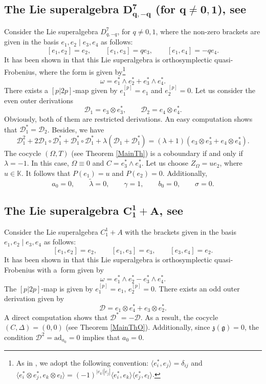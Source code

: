 \documentclass[pdftex]{sigma}
\numberwithin{equation}{section}
\begin{document}
\subsection[The Lie superalgebra D\^{}7\_\{q,-q\} (for q not = 0,1), see cite{Ba}]{The Lie superalgebra $\boldsymbol{D^7_{q,-q}}$ (for $\boldsymbol{q\not = 0,1}$), see \cite{Ba}} Consider the Lie superalgebra $D^7_{q,-q}$, for $q\not = 0,1$, where the non-zero brackets are given in the basis $e_1, e_2\mid e_3, e_4$ as follows:
\[
[e_1, e_2]=e_2, \qquad [e_1, e_3]= q e_3, \qquad [e_1, e_4]=-q e_4.
\]
It has been shown in \cite{BM} that this Lie superalgebra is orthosymplectic quasi-Frobenius, where the form is given by\footnote{As in \cite{BM}, we adopt the following convention: $\langle e_i^*, e_j\rangle=\delta_{ij}$ and $\langle e_i^*\otimes e_j^*, e_k\otimes e_l\rangle= (-1)^{|e_k||e_j|} \langle e_i^*, e_k \rangle\langle e_j^*, e_l\rangle $.}
\[
\omega= e_1^*\wedge e_2^*+e_3^*\wedge e_4^*.
\]
There exists a $[p|2p]$-map given by $e_1^{[p]}=e_1$ and $e_2^{[p]}=0.$ Let us consider the even outer derivations
\[
{\mathscr D}_1= e_3\otimes e_3^*, \qquad {\mathscr D}_2=e_4\otimes e_4^*.
\]
Obviously, both of them are restricted derivations. An easy computation shows that ${\mathscr D}_1^*={\mathscr D}_2$. Besides, we have
\[
{\mathscr D}_1^2+ 2 {\mathscr D}_1\circ {\mathscr D}_1^*+{\mathscr D}_1^*\circ {\mathscr D}_1^* +\lambda({\mathscr D}_1+{\mathscr D}_1^*)=(\lambda+1)(e_3\otimes e_3^*+ e_4\otimes e_4^*).
\]
The cocycle $(\Omega,T)$ (see Theorem \ref{MainTh}) is a coboundary if and only if $\lambda=-1$. In this case, $\Omega \equiv 0$ and $C=e_3^*\wedge e_4^*$. Let us choose $Z_\Omega=u e_2$, where $u\in \mathbb K$. It follows that $P(e_1)=u$ and $P(e_2)=0$. Additionally,
\[
a_0=0, \qquad \tilde \lambda=0, \qquad \gamma=1, \qquad b_0=0, \qquad \sigma=0.
\]

\subsection[The Lie superalgebra C\_1\^{}1+A, see \protect{[2]}]{The Lie superalgebra $\boldsymbol{C_1^1+A}$, see \cite{Ba}}

 Consider the Lie superalgebra $C_1^1+A$ with the brackets given in the basis $e_1, e_2\mid e_3, e_4$ as follows:%
\[
[e_1, e_2]=e_2, \qquad [e_1, e_3]=e_3,\qquad [e_3, e_4]=e_2.
\]
It has been shown in \cite{BM} that this Lie superalgebra is orthosymplectic quasi-Frobenius with a~form given by
\[
\omega=e_1^*\wedge e_2^* - e_3^*\wedge e_4^*.
\]
The $[p|2p]$-map is given by
$
e_1^{[p]}=e_1$, $e_2^{[p]}=0$. There exists an odd outer derivation given by
\[
{\mathscr D}=e_1\otimes e_4^*+e_3\otimes e_2^*.
\]
A direct computation shows that ${\mathscr D}^*=-{\mathscr D}$. As a result, the cocycle $(C, \Delta)=(0,0)$ (see Theorem \ref{MainThO}). Additionally, since ${\mathfrak z}(\mathfrak{g})=0$, the condition ${\mathscr D}^2=\mathrm{ad}_{a_0}=0$ implies that $a_0=0$.
\end{document}
